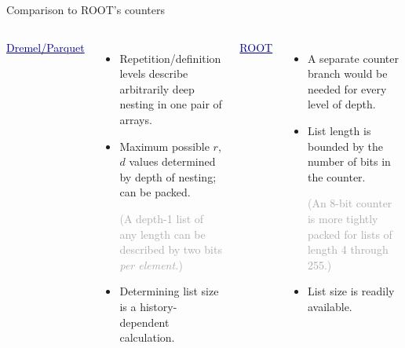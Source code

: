 \documentclass{beamer}
\begin{document}
\begin{frame}{Comparison to ROOT's counters}
\vspace{0.5 cm}
\begin{columns}[t]
\textcolor{darkblue}{\underline{\large Dremel/Parquet}}

\begin{itemize}
\item Repetition/definition levels describe arbitrarily deep nesting in one pair of arrays.

\item Maximum possible $r$, $d$ values determined by depth of nesting; can be packed.

\textcolor{darkgrey}{(A depth-1 list of any length can be described by two bits {\it per element.})}

\item Determining list size is a history-dependent calculation.

\end{itemize}

\textcolor{darkblue}{\underline{\large ROOT}}

\begin{itemize}
\item A separate counter branch would be needed for every level of depth.

\item List length is bounded by the number of bits in the counter.

\textcolor{darkgrey}{(An 8-bit counter is more tightly packed for lists of length 4 through 255.)}

\item List size is readily available.
\end{itemize}
\end{columns}
\end{frame}
\end{document}
